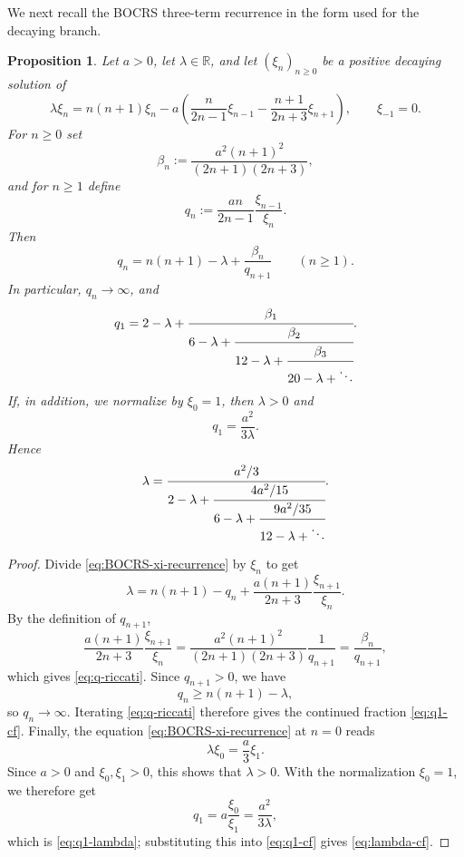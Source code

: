 \documentclass[11pt,letterpaper]{amsart}
\numberwithin{equation}{section}
\theoremstyle{plain}
\newtheorem{proposition}[theorem]{Proposition}
\theoremstyle{remark}
\begin{document}
We next recall the BOCRS three-term recurrence in the form used for the decaying branch.

\begin{proposition}\label{prop:boq}
Let $a>0$, let $\lambda\in\mathbb R$, and let $(\xi_n)_{n\ge 0}$ be a positive decaying solution of
\begin{equation}\label{eq:BOCRS-xi-recurrence}
\lambda\xi_n
=
 n(n+1)\xi_n
 -a\left(\frac{n}{2n-1}\xi_{n-1}-\frac{n+1}{2n+3}\xi_{n+1}\right),
 \qquad \xi_{-1}=0.
\end{equation}
For $n\ge 0$ set
\begin{equation}\label{eq:beta-def}
\beta_n:=\frac{a^2(n+1)^2}{(2n+1)(2n+3)},
\end{equation}
and for $n\ge 1$ define
\begin{equation}\label{eq:q-def}
q_n:=\frac{an}{2n-1}\frac{\xi_{n-1}}{\xi_n}.
\end{equation}
Then
\begin{equation}\label{eq:q-riccati}
q_n=n(n+1)-\lambda+\frac{\beta_n}{q_{n+1}}
\qquad(n\ge 1).
\end{equation}
In particular, $q_n\to\infty$, and
\begin{equation}\label{eq:q1-cf}
q_1
=
2-\lambda+\cfrac{\beta_1}{6-\lambda+\cfrac{\beta_2}{12-\lambda+\cfrac{\beta_3}{20-\lambda+\ddots}}}.
\end{equation}
If, in addition, we normalize by \(\xi_0=1\), then \(\lambda>0\) and
\begin{equation}\label{eq:q1-lambda}
q_1=\frac{a^2}{3\lambda}.
\end{equation}
Hence
\begin{equation}\label{eq:lambda-cf}
\lambda=
\cfrac{a^2/3}{2-\lambda+\cfrac{4a^2/15}{6-\lambda+\cfrac{9a^2/35}{12-\lambda+\ddots}}}.
\end{equation}
\end{proposition}

\begin{proof}
Divide \eqref{eq:BOCRS-xi-recurrence} by $\xi_n$ to get
\[
\lambda
=
n(n+1)-q_n+\frac{a(n+1)}{2n+3}\frac{\xi_{n+1}}{\xi_n}.
\]
By the definition of $q_{n+1}$,
\[
\frac{a(n+1)}{2n+3}\frac{\xi_{n+1}}{\xi_n}
=
\frac{a^2(n+1)^2}{(2n+1)(2n+3)}\frac{1}{q_{n+1}}
=
\frac{\beta_n}{q_{n+1}},
\]
which gives \eqref{eq:q-riccati}. Since $q_{n+1}>0$, we have
\[
q_n\ge n(n+1)-\lambda,
\]
so $q_n\to\infty$. Iterating \eqref{eq:q-riccati} therefore gives the continued fraction \eqref{eq:q1-cf}. Finally, the equation \eqref{eq:BOCRS-xi-recurrence} at \(n=0\) reads
\[
\lambda\xi_0=\frac{a}{3}\xi_1.
\]
Since \(a>0\) and \(\xi_0,\xi_1>0\), this shows that \(\lambda>0\).
With the normalization \(\xi_0=1\), we therefore get
\[
q_1=a\frac{\xi_0}{\xi_1}=\frac{a^2}{3\lambda},
\]
which is \eqref{eq:q1-lambda}; substituting this into \eqref{eq:q1-cf} gives
\eqref{eq:lambda-cf}.
\end{proof}
\end{document}

